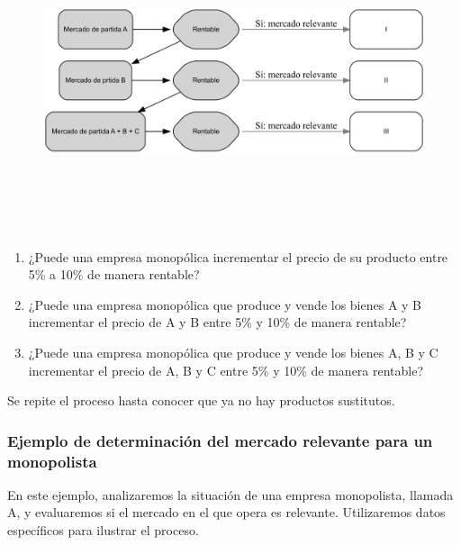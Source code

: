 \documentclass[
  letterpaper,
  DIV=11,
  numbers=noendperiod]{scrartcl}
\begin{document}
\begin{figure}[H]

{\centering \includegraphics[width=5.5in,height=3.5in]{index_files/figure-latex/dot-figure-1.png}

}

\end{figure}

\begin{enumerate}
\def\labelenumi{\arabic{enumi}.}
\item
  ¿Puede una empresa monopólica incrementar el precio de su producto
  entre 5\% a 10\% de manera rentable?
\item
  ¿Puede una empresa monopólica que produce y vende los bienes A y B
  incrementar el precio de A y B entre 5\% y 10\% de manera rentable?
\item
  ¿Puede una empresa monopólica que produce y vende los bienes A, B y C
  incrementar el precio de A, B y C entre 5\% y 10\% de manera rentable?
\end{enumerate}

Se repite el proceso hasta conocer que ya no hay productos sustitutos.

\hypertarget{ejemplo-de-determinaciuxf3n-del-mercado-relevante-para-un-monopolista}{%
\subsubsection{Ejemplo de determinación del mercado relevante para un
monopolista}\label{ejemplo-de-determinaciuxf3n-del-mercado-relevante-para-un-monopolista}}

En este ejemplo, analizaremos la situación de una empresa monopolista,
llamada A, y evaluaremos si el mercado en el que opera es relevante.
Utilizaremos datos específicos para ilustrar el proceso.
\end{document}
